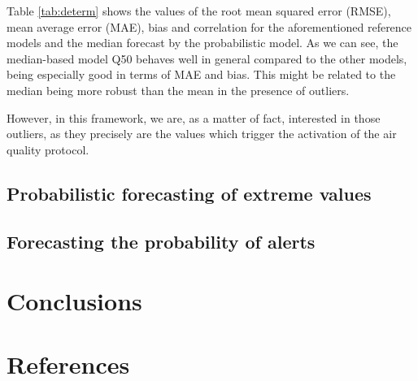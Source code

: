 \documentclass[a4paper,twocolumn,5p]{elsarticle}
\begin{document}
Table \ref{tab:determ} shows the values of the root mean squared error
(RMSE), mean average error (MAE), bias and correlation for the
aforementioned reference models and the median forecast by the
probabilistic model. As we can see, the median-based model Q50 behaves
well in general compared to the other models, being especially good in
terms of MAE and bias. This might be related to the median being more
robust than the mean in the presence of outliers.

However, in this framework, we are, as a matter of fact, interested in
those outliers, as they precisely are the values which trigger the
activation of the air quality protocol.


\subsection{Probabilistic forecasting of extreme values}
\label{sec:probabilistic}


\subsection{Forecasting the probability of alerts}
\label{sec:alertProb2}


\section{Conclusions}
\label{sec:concl}


\section*{References}


\end{document}
